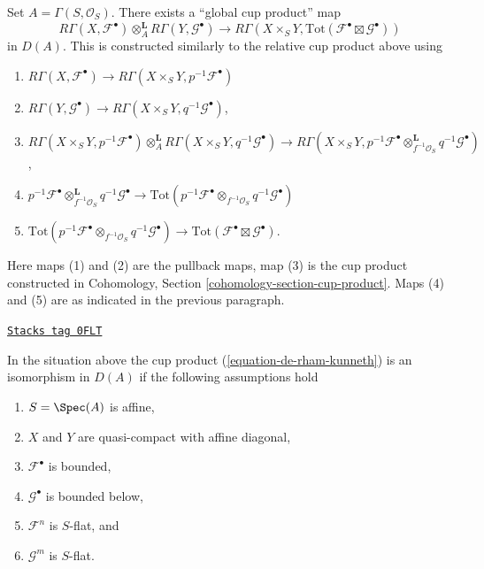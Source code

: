 \medskip\noindent
Set $A = \Gamma(S, \mathcal{O}_S)$. There exists a ``global cup product'' map
\begin{equation}
\label{equation-de-rham-kunneth}
R\Gamma(X, \mathcal{F}^\bullet)
\otimes_A^\mathbf{L}
R\Gamma(Y, \mathcal{G}^\bullet)
\longrightarrow
R\Gamma(X \times_S Y,
\text{Tot}(\mathcal{F}^\bullet \boxtimes \mathcal{G}^\bullet))
\end{equation}
in $D(A)$. This is constructed similarly to the relative cup product above
using
\begin{enumerate}
\item $R\Gamma(X, \mathcal{F}^\bullet) \to
R\Gamma(X \times_S Y, p^{-1}\mathcal{F}^\bullet)$
\item $R\Gamma(Y, \mathcal{G}^\bullet) \to
R\Gamma(X \times_S Y, q^{-1}\mathcal{G}^\bullet)$,
\item $R\Gamma(X \times_S Y, p^{-1}\mathcal{F}^\bullet)
\otimes_A^\mathbf{L} R\Gamma(X \times_S Y, q^{-1}\mathcal{G}^\bullet) \to
R\Gamma(X \times_S Y,
p^{-1}\mathcal{F}^\bullet \otimes_{f^{-1}\mathcal{O}_S}^\mathbf{L}
q^{-1}\mathcal{G}^\bullet)$,
\item
$p^{-1}\mathcal{F}^\bullet \otimes_{f^{-1}\mathcal{O}_S}^\mathbf{L}
q^{-1}\mathcal{G}^\bullet \to
\text{Tot}(p^{-1}\mathcal{F}^\bullet \otimes_{f^{-1}\mathcal{O}_S}
q^{-1}\mathcal{G}^\bullet)$
\item
$\text{Tot}(p^{-1}\mathcal{F}^\bullet \otimes_{f^{-1}\mathcal{O}_S}
q^{-1}\mathcal{G}^\bullet) \to \text{Tot}(\mathcal{F}^\bullet \boxtimes
\mathcal{G}^\bullet)$.
\end{enumerate}
Here maps (1) and (2) are the pullback maps, map (3) is the cup product
constructed in Cohomology, Section \ref{cohomology-section-cup-product}.
Maps (4) and (5) are as indicated in the previous paragraph.

\begin{lemma}
\label{perfect-lemma-kunneth-special}
\href{https://stacks.math.columbia.edu/tag/0FLT}{\texttt{Stacks tag 0FLT}}

In the situation above the cup product (\ref{equation-de-rham-kunneth})
is an isomorphism in $D(A)$ if the following assumptions hold
\begin{enumerate}
\item $S = \Spec(A)$ is affine,
\item $X$ and $Y$ are quasi-compact with affine diagonal,
\item $\mathcal{F}^\bullet$ is bounded,
\item $\mathcal{G}^\bullet$ is bounded below,
\item $\mathcal{F}^n$ is $S$-flat, and
\item $\mathcal{G}^m$ is $S$-flat.
\end{enumerate}
\end{lemma}

